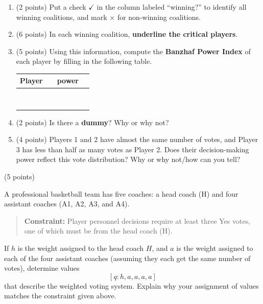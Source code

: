\documentclass[12pt]{article}
\renewcommand{\emph}[1]{\textsf{\textbf{#1}}}
\newcounter{probcount}
\newcounter{subprobcount}
\newenvironment{subproblems}{%
\begin{enumerate}%
\setcounter{enumi}{\value{subprobcount}}%
\renewcommand{\theenumi}{\emph{\alph{enumi}}}}%
{\setcounter{subprobcount}{\value{enumi}}\end{enumerate}}
\begin{document}
\begin{subproblems}
    
    \item (2 points) Put a check $\checkmark$ in the column labeled ``winning?'' to identify all winning coalitions, and mark  $\times$ for non-winning coalitions.

    \item (6 points) In each winning coalition, \emph{underline the critical players}.
    
  \item (5 points) Using this information, compute the \emph{Banzhaf Power Index} of each player by filling in the following table.




\begin{tabular}{c | p{.75in} | c c }
Player & &  power \\ \hline
&&&\\
&&&\\&&&\\&&&\\&&&\\&&&\\&&&\\&&&\\
\end{tabular}
\item (2 points) Is there a \emph{dummy}? Why or why not?
\vfill

  \item (4 points) Players 1 and 2 have almost the same number of votes, and Player 3 has less than half as many votes as Player 2. Does their decision-making power reflect this vote distribution? Why or why not/how can you tell?
  
  \vfill

\end{subproblems}

\newpage

 (5 points)


A professional basketball team has five coaches: a head coach (H) and four assistant coaches (A1, A2, A3, and A4). 

\begin{quote}
\emph{Constraint:} Player personnel decisions require at least three Yes votes, one of which must be from the head coach (H).
\end{quote}

If $h$ is the weight assigned to the head coach $H$, and $a$ is the weight assigned to each of the four assistant coaches (assuming they each get the same number of votes), determine values  \[ [q: h, a, a, a, a] \] that describe the weighted voting system. Explain why your assignment of values matches the constraint given above. 


\vfill 





\end{document}
